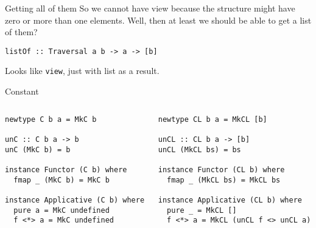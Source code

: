 \documentclass[presentation,aspectratio=169,8pt]{beamer}
\begin{document}
\begin{frame}[label={sec:org5b811b8},fragile]{Getting all of them}
 So we cannot have view because the structure might have zero or more than one
elements. Well, then at least we should be able to get a list of them?

\begin{verbatim}
listOf :: Traversal a b -> a -> [b]
\end{verbatim}

\pause

Looks like \texttt{view}, just with list as a result.
\end{frame}

\begin{frame}[label={sec:orgfc27415},fragile]{Constant}
 \begin{columns}
\begin{column}{0.5\columnwidth}
\begin{verbatim}
newtype C b a = MkC b

unC :: C b a -> b
unC (MkC b) = b

instance Functor (C b) where
  fmap _ (MkC b) = MkC b

instance Applicative (C b) where
  pure a = MkC undefined
  f <*> a = MkC undefined
\end{verbatim}
\end{column}

\begin{column}{0.5\columnwidth}
\begin{verbatim}
newtype CL b a = MkCL [b]

unCL :: CL b a -> [b]
unCL (MkCL bs) = bs

instance Functor (CL b) where
  fmap _ (MkCL bs) = MkCL bs

instance Applicative (CL b) where
  pure _ = MkCL []
  f <*> a = MkCL (unCL f <> unCL a)
\end{verbatim}
\end{column}
\end{columns}
\end{frame}
\end{document}
